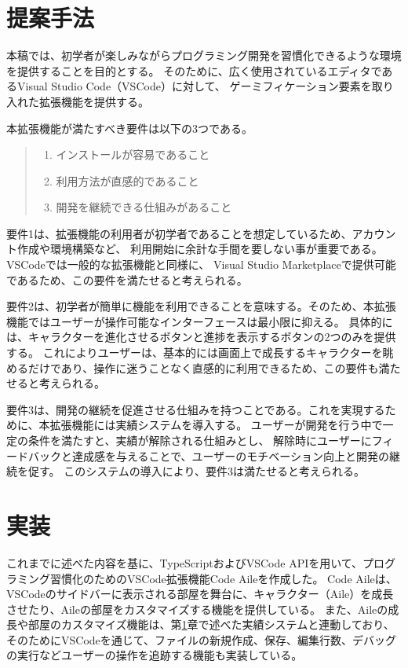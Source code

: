 \documentclass[12pt,twoside]{jbook}
\begin{document}
\chapter{提案手法} \label{sec:proposal}

 本稿では、初学者が楽しみながらプログラミング開発を習慣化できるような環境を提供することを目的とする。
そのために、広く使用されているエディタであるVisual Studio Code（VSCode）に対して、
ゲーミフィケーション要素を取り入れた拡張機能を提供する。

 本拡張機能が満たすべき要件は以下の3つである。
\begin{quote}
	\begin{enumerate}
	 \item インストールが容易であること
	 \item 利用方法が直感的であること
	 \item 開発を継続できる仕組みがあること
	\end{enumerate}
\end{quote}

 要件1は、拡張機能の利用者が初学者であることを想定しているため、アカウント作成や環境構築など、
利用開始に余計な手間を要しない事が重要である。VSCodeでは一般的な拡張機能と同様に、
Visual Studio Marketplaceで提供可能であるため、この要件を満たせると考えられる。

 要件2は、初学者が簡単に機能を利用できることを意味する。そのため、本拡張機能ではユーザーが操作可能なインターフェースは最小限に抑える。
具体的には、キャラクターを進化させるボタンと進捗を表示するボタンの2つのみを提供する。
これによりユーザーは、基本的には画面上で成長するキャラクターを眺めるだけであり、操作に迷うことなく直感的に利用できるため、この要件も満たせると考えられる。

 要件3は、開発の継続を促進させる仕組みを持つことである。これを実現するために、本拡張機能には実績システムを導入する。
ユーザーが開発を行う中で一定の条件を満たすと、実績が解除される仕組みとし、
解除時にユーザーにフィードバックと達成感を与えることで、ユーザーのモチベーション向上と開発の継続を促す。
このシステムの導入により、要件3は満たせると考えられる。


\chapter{実装}
 これまでに述べた内容を基に、TypeScriptおよびVSCode APIを用いて、プログラミング習慣化のためのVSCode拡張機能Code Aileを作成した。
Code Aileは、VSCodeのサイドバーに表示される部屋を舞台に、キャラクター（Aile）を成長させたり、Aileの部屋をカスタマイズする機能を提供している。
また、Aileの成長や部屋のカスタマイズ機能は、第\ref{sec:proposal}章で述べた実績システムと連動しており、
そのためにVSCodeを通じて、ファイルの新規作成、保存、編集行数、デバッグの実行などユーザーの操作を追跡する機能も実装している。
\end{document}
